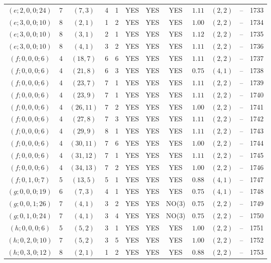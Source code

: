 \begin{longtable}{|c|c|c|c|c|c|c|c|c|c|c|c|}
$(e;2,0,0;24)$ & 7 & $(7,3)$ & 4 & 1 & YES & YES & YES & $1.11$ & $(2,2)$ & -- & 1733\\
$(e;3,0,0;10)$ & 8 & $(2,1)$ & 1 & 2 & YES & YES & YES & $1.00$ & $(2,2)$ & -- & 1734\\
$(e;3,0,0;10)$ & 8 & $(3,1)$ & 2 & 1 & YES & YES & YES & $1.12$ & $(2,2)$ & -- & 1735\\
$(e;3,0,0;10)$ & 8 & $(4,1)$ & 3 & 2 & YES & YES & YES & $1.11$ & $(2,2)$ & -- & 1736\\
$(f;0,0,0;6)$ & 4 & $(18,7)$ & 6 & 6 & YES & YES & YES & $1.11$ & $(2,2)$ & -- & 1737\\
$(f;0,0,0;6)$ & 4 & $(21,8)$ & 6 & 3 & YES & YES & YES & $0.75$ & $(4,1)$ & -- & 1738\\
$(f;0,0,0;6)$ & 4 & $(23,7)$ & 7 & 1 & YES & YES & YES & $1.11$ & $(2,2)$ & -- & 1739\\
$(f;0,0,0;6)$ & 4 & $(23,9)$ & 7 & 1 & YES & YES & YES & $1.11$ & $(2,2)$ & -- & 1740\\
$(f;0,0,0;6)$ & 4 & $(26,11)$ & 7 & 2 & YES & YES & YES & $1.00$ & $(2,2)$ & -- & 1741\\
$(f;0,0,0;6)$ & 4 & $(27,8)$ & 7 & 3 & YES & YES & YES & $1.11$ & $(2,2)$ & -- & 1742\\
$(f;0,0,0;6)$ & 4 & $(29,9)$ & 8 & 1 & YES & YES & YES & $1.11$ & $(2,2)$ & -- & 1743\\
$(f;0,0,0;6)$ & 4 & $(30,11)$ & 7 & 6 & YES & YES & YES & $1.00$ & $(2,2)$ & -- & 1744\\
$(f;0,0,0;6)$ & 4 & $(31,12)$ & 7 & 1 & YES & YES & YES & $1.11$ & $(2,2)$ & -- & 1745\\
$(f;0,0,0;6)$ & 4 & $(34,13)$ & 7 & 2 & YES & YES & YES & $1.00$ & $(2,2)$ & -- & 1746\\
$(f;0,1,0;7)$ & 5 & $(13,5)$ & 5 & 1 & YES & YES & YES & $0.88$ & $(4,1)$ & -- & 1747\\
$(g;0,0,0;19)$ & 6 & $(7,3)$ & 4 & 1 & YES & YES & YES & $0.75$ & $(4,1)$ & -- & 1748\\
$(g;0,0,1;26)$ & 7 & $(4,1)$ & 3 & 2 & YES & YES & NO(3) & $0.75$ & $(2,2)$ & -- & 1749\\
$(g;0,1,0;24)$ & 7 & $(4,1)$ & 3 & 4 & YES & YES & NO(3) & $0.75$ & $(2,2)$ & -- & 1750\\
$(h;0,0,0;6)$ & 5 & $(5,2)$ & 3 & 1 & YES & YES & YES & $1.00$ & $(2,2)$ & -- & 1751\\
$(h;0,2,0;10)$ & 7 & $(5,2)$ & 3 & 5 & YES & YES & YES & $1.00$ & $(2,2)$ & -- & 1752\\
$(h;0,3,0;12)$ & 8 & $(2,1)$ & 1 & 2 & YES & YES & YES & $0.88$ & $(2,2)$ & -- & 1753\\

\end{longtable}
